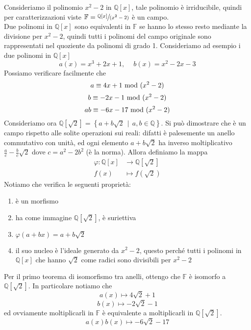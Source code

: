 \begin{esempio}
	Consideriamo il polinomio $x^2-2$ in $\mathbb{Q}[x]$, tale polinomio è irriducibile, quindi per caratterizzazioni viste $\mathbb{F}=\sfrac{\mathbb{Q}[x]}{(x^2-2)}$ è un campo. \\ Due polinomi in $\mathbb{Q}[x]$ sono equivalenti in $\mathbb{F}$ se hanno lo stesso resto mediante la divisione per $x^2-2$, quindi tutti i polinomi del campo originale sono rappresentati nel quoziente da polinomi di grado 1. Consideriamo ad esempio i due polinomi in $\mathbb{Q}[x]$
	\begin{equation*}
	a(x)=x^3+2x+1, \quad\ b(x)=x^2-2x-3 
	\end{equation*}
	Possiamo verificare facilmente che 
	\begin{equation*}
	a\equiv4x+1\ \mathrm{mod}\ (x^2-2)
	\end{equation*}
	\begin{equation*}
	b\equiv-2x-1\ \mathrm{mod}\ (x^2-2)
	\end{equation*}
	\begin{equation*}
	ab\equiv-6x-17\ \mathrm{mod}\ (x^2-2)
	\end{equation*}
	Consideriamo ora $\mathbb{Q}[\sqrt{2}]=\left\{a+b\sqrt{2} \, \mid \, a,b\in\mathbb{Q}\right\}$. Si può dimostrare che è un campo rispetto alle solite operazioni sui reali: difatti è palesemente un anello commutativo con unità, ed ogni elemento $a+b\sqrt{2}$ ha inverso moltiplicativo $\frac{a}{c}-\frac{b}{c}\sqrt{2}$ dove $c=a^2-2b^2$ (è la norma). Allora definiamo la mappa
	\begin{align*}
	\varphi:\mathbb{Q}[x]&\longrightarrow\mathbb{Q}[\sqrt{2}]\\
	f(x)&\longmapsto f(\sqrt{2})
	\end{align*}
	Notiamo che verifica le seguenti proprietà:
	\begin{enumerate}
		\item è un morfismo
		\item ha come immagine $\mathbb{Q}[\sqrt{2}]$, è suriettiva
		\item $\varphi\left(a+bx\right)=a+b\sqrt{2}$
		\item il suo nucleo è l'ideale generato da $x^2-2$, questo perché tutti i polinomi in $\mathbb{Q}[x]$ che hanno $\sqrt{2}$ come radici sono divisibili per $x^2-2$
	\end{enumerate}
	Per il primo teorema di isomorfismo tra anelli, ottengo che $\mathbb{F}$ è isomorfo a $\mathbb{Q}[\sqrt{2}]$. In particolare notiamo che 
	\begin{equation*}
	a(x) \mapsto 4\sqrt{2}+1
	\end{equation*}
	\begin{equation*}
	b(x) \mapsto -2\sqrt{2}-1
	\end{equation*}
	ed ovviamente moltiplicarli in $\mathbb{F}$ è equivalente a moltiplicarli in $\mathbb{Q}[\sqrt{2}]$.
	\begin{equation*}
	a(x)b(x) \mapsto -6\sqrt{2}-17
	\end{equation*}
\end{esempio}
